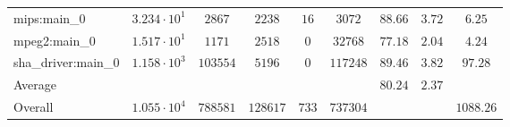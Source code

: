 \begin{tabular}{|l|c|c|c|c|c|c|c|c|}
mips:main\_0            & $ 3.234 \cdot 10^{1} $ & $ 2867   $ & $ 2238   $ & $ 16  $ & $ 3072   $ & $ 88.66       $ & $ 3.72    $ & $ 6.25    $ \\
mpeg2:main\_0           & $ 1.517 \cdot 10^{1} $ & $ 1171   $ & $ 2518   $ & $ 0   $ & $ 32768  $ & $ 77.18       $ & $ 2.04    $ & $ 4.24    $ \\
sha\_driver:main\_0     & $ 1.158 \cdot 10^{3} $ & $ 103554 $ & $ 5196   $ & $ 0   $ & $ 117248 $ & $ 89.46       $ & $ 3.82    $ & $ 97.28   $ \\
\hline
Average                 & $                    $ & $        $ & $        $ & $     $ & $        $ & $ 80.24       $ & $ 2.37    $ & $         $ \\
\hline
Overall                 & $ 1.055 \cdot 10^{4} $ & $ 788581 $ & $ 128617 $ & $ 733 $ & $ 737304 $ & $             $ & $         $ & $ 1088.26 $ \\
\hline
\end{tabular}
